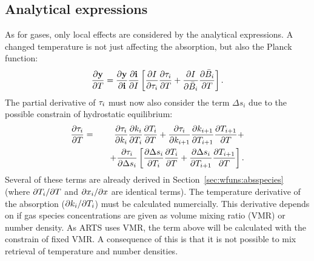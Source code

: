 \subsection{Analytical expressions}
%
As for gases, only local effects are considered by the analytical expressions.
A changed temperature is not just affecting the absorption, but also the Planck
function:
\begin{equation}
  \frac{\partial \mathbf{y}}{\partial T} =  
  \frac{\partial \mathbf{y}}{\partial \mathbf{i}} \frac{\partial \mathbf{i}}{\partial I} 
  \left[
  \frac{\partial I}{\partial \tau_{i}}\frac{\partial \tau_{i}}{\partial T} + 
  \frac{\partial I}{\partial \bar{B}_i}\frac{\partial \bar{B}_i}{\partial T}
  \right].
 \label{eq:wfuns:t1}
\end{equation}
The partial derivative of $\tau_{i}$ must
now also consider the term $\Delta s_i$ due to the possible constrain of
hydrostatic equilibrium:
\begin{eqnarray}
  \frac{\partial \tau_{i}}{\partial T} &=&
  \frac{\partial \tau_{i}}{\partial k_i}\frac{\partial k_i}{\partial T_i} 
  \frac{\partial T_i}{\partial T} +
  \frac{\partial \tau_{i}}{\partial k_{i+1}}\frac{\partial k_{i+1}}{\partial T_{i+1}}
  \frac{\partial T_{i+1}}{\partial T} + \nonumber \\ &&
  \quad + \frac{\partial \tau_{i}}{\partial \Delta s_i}
  \left[
    \frac{\partial \Delta s_i}{\partial T_i} \frac{\partial T_i}{\partial T} +
    \frac{\partial \Delta s_i}{\partial T_{i+1}} \frac{\partial T_{i+1}}{\partial T}
  \right].
\end{eqnarray}
Several of these terms are already derived in
Section~\ref{sec:wfuns:absspecies} (where $\partial T_i/\partial T$ and $\partial
x_i/\partial x$ are identical terms). The temperature derivative of the
absorption ($\partial k_i/\partial T_i$) must be calculated numercially. This
derivative depends on if gas species concentrations are given as volume mixing
ratio (VMR) or number density. As ARTS uses VMR, the term above will be
calculated with the constrain of fixed VMR. A consequence of this is that it is
not possible to mix retrieval of temperature and number densities.

